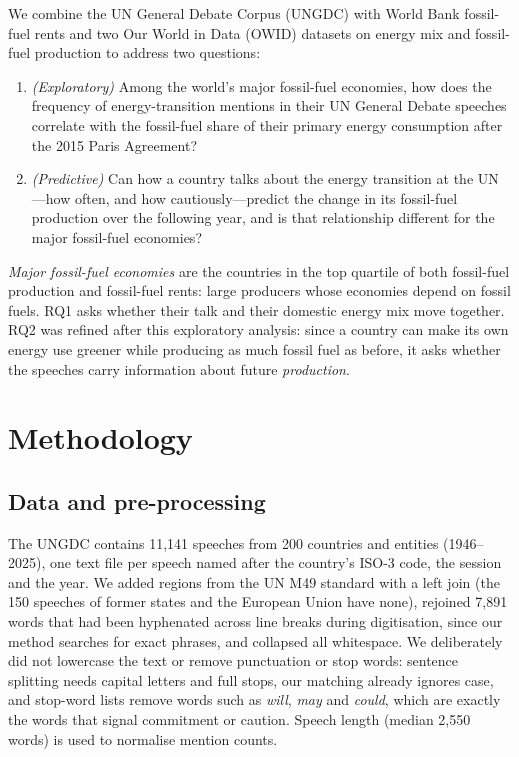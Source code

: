 \documentclass{llncs}
\begin{document}
We combine the UN General Debate Corpus (UNGDC) \cite{jankin2025words,baturo2017understanding} with World Bank fossil-fuel rents \cite{worldbank_wdi_coal,worldbank_wdi_gas,worldbank_wdi_oil} and two Our World in Data (OWID) datasets on energy mix \cite{owid-energy-mix} and fossil-fuel production \cite{owid-fossil-fuel-production} to address two questions:

\begin{enumerate}
    \item[\textbf{RQ1}] \textit{(Exploratory)} Among the world's major fossil-fuel economies, how does the frequency of energy-transition mentions in their UN General Debate speeches correlate with the fossil-fuel share of their primary energy consumption after the 2015 Paris Agreement?
    \item[\textbf{RQ2}] \textit{(Predictive)} Can how a country talks about the energy transition at the UN---how often, and how cautiously---predict the change in its fossil-fuel production over the following year, and is that relationship different for the major fossil-fuel economies?
\end{enumerate}

\emph{Major fossil-fuel economies} are the countries in the top quartile of both fossil-fuel production and fossil-fuel rents: large producers whose economies depend on fossil fuels. RQ1 asks whether their talk and their domestic energy mix move together. RQ2 was refined after this exploratory analysis: since a country can make its own energy use greener while producing as much fossil fuel as before, it asks whether the speeches carry information about future \emph{production}.

\section{Methodology}
\subsection{Data and pre-processing}
The UNGDC contains 11{,}141 speeches from 200 countries and entities (1946--2025), one text file per speech named after the country's ISO-3 code, the session and the year. We added regions from the UN M49 standard with a left join (the 150 speeches of former states and the European Union have none), rejoined 7{,}891 words that had been hyphenated across line breaks during digitisation, since our method searches for exact phrases, and collapsed all whitespace. We deliberately did not lowercase the text or remove punctuation or stop words: sentence splitting needs capital letters and full stops, our matching already ignores case, and stop-word lists remove words such as \textit{will}, \textit{may} and \textit{could}, which are exactly the words that signal commitment or caution. Speech length (median 2{,}550 words) is used to normalise mention counts.
\end{document}
